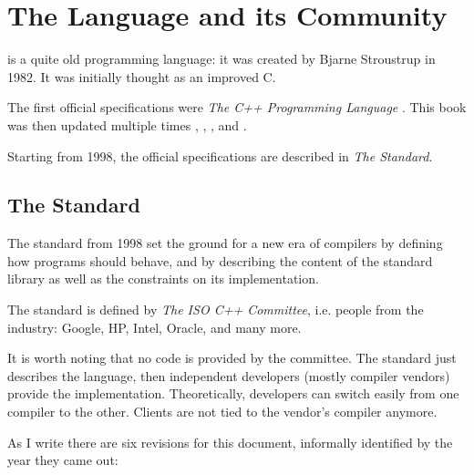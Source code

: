 \chapter{The \Cpp{} Language and its Community}

\Cpp{} is a quite old programming language: it was created by Bjarne
Stroustrup in 1982. It was initially thought as an improved C.

The first official specifications were \emph{The C++ Programming
  Language} \cite{the-cpp-programming-language-1st}. This book was
then updated multiple times \cite{the-cpp-programming-language-2nd},
\cite{the-cpp-programming-language-3rd},
\cite{the-cpp-programming-language-se}, and
\cite{the-cpp-programming-language-4th}.

Starting from 1998, the official specifications are described in
\emph{The Standard}.

\section{The Standard}

The standard from 1998 set the ground for a new era of compilers by
defining how \cpp{} programs should behave, and by describing the
content of the standard library as well as the constraints on its
implementation.

The standard is defined by {\em The ISO C++ Committee}, i.e. people
from the industry: Google, HP, Intel, Oracle, and many more.

It is worth noting that no code is provided by the committee. The
standard just describes the language, then independent developers
(mostly compiler vendors) provide the implementation. Theoretically,
developers can switch easily from one compiler to the other. Clients
are not tied to the vendor's compiler anymore.

As I write there are six revisions for this document, informally
identified by the year they came out:

